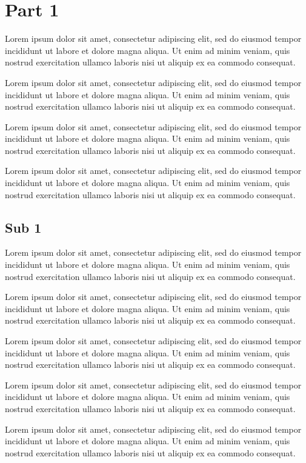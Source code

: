 \documentclass{article}
\begin{document}
\tableofcontents
\section{Part 1}
Lorem ipsum dolor sit amet, consectetur adipiscing elit, sed do eiusmod tempor incididunt ut labore et dolore magna aliqua. Ut enim ad minim veniam, quis nostrud exercitation ullamco laboris nisi ut aliquip ex ea commodo consequat.

Lorem ipsum dolor sit amet, consectetur adipiscing elit, sed do eiusmod tempor incididunt ut labore et dolore magna aliqua. Ut enim ad minim veniam, quis nostrud exercitation ullamco laboris nisi ut aliquip ex ea commodo consequat.

Lorem ipsum dolor sit amet, consectetur adipiscing elit, sed do eiusmod tempor incididunt ut labore et dolore magna aliqua. Ut enim ad minim veniam, quis nostrud exercitation ullamco laboris nisi ut aliquip ex ea commodo consequat.

Lorem ipsum dolor sit amet, consectetur adipiscing elit, sed do eiusmod tempor incididunt ut labore et dolore magna aliqua. Ut enim ad minim veniam, quis nostrud exercitation ullamco laboris nisi ut aliquip ex ea commodo consequat.

\subsection{Sub 1}
Lorem ipsum dolor sit amet, consectetur adipiscing elit, sed do eiusmod tempor incididunt ut labore et dolore magna aliqua. Ut enim ad minim veniam, quis nostrud exercitation ullamco laboris nisi ut aliquip ex ea commodo consequat.

Lorem ipsum dolor sit amet, consectetur adipiscing elit, sed do eiusmod tempor incididunt ut labore et dolore magna aliqua. Ut enim ad minim veniam, quis nostrud exercitation ullamco laboris nisi ut aliquip ex ea commodo consequat.

Lorem ipsum dolor sit amet, consectetur adipiscing elit, sed do eiusmod tempor incididunt ut labore et dolore magna aliqua. Ut enim ad minim veniam, quis nostrud exercitation ullamco laboris nisi ut aliquip ex ea commodo consequat.

Lorem ipsum dolor sit amet, consectetur adipiscing elit, sed do eiusmod tempor incididunt ut labore et dolore magna aliqua. Ut enim ad minim veniam, quis nostrud exercitation ullamco laboris nisi ut aliquip ex ea commodo consequat.

Lorem ipsum dolor sit amet, consectetur adipiscing elit, sed do eiusmod tempor incididunt ut labore et dolore magna aliqua. Ut enim ad minim veniam, quis nostrud exercitation ullamco laboris nisi ut aliquip ex ea commodo consequat.
\end{document}
